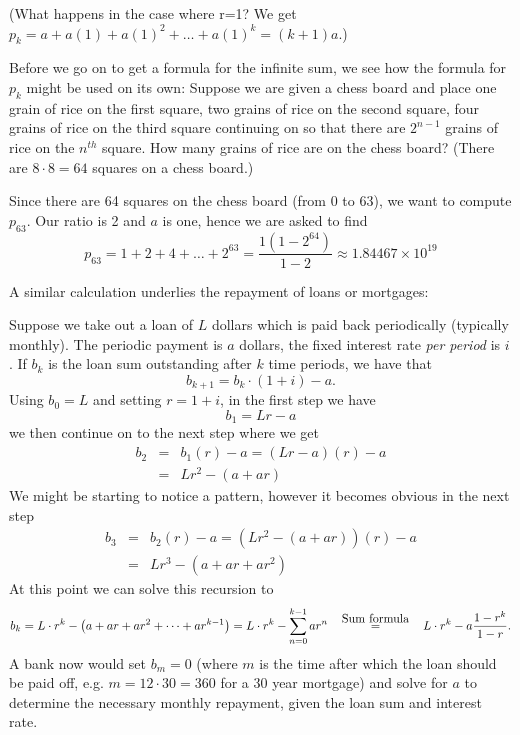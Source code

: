 (What happens in the case where r=1?
We get $p_{k}= a + a(1) + a(1)^{2} + \ldots + a(1)^{k}=(k+1)a$.)
\medskip

Before we go on to get a formula for the infinite sum, we see
how the formula for $p_{k}$ might be used on its own:
Suppose we are given a chess board and place one grain of rice on
the first square, two grains of rice on the second square, four
grains of rice on the third square continuing on so that there are
$2^{n-1}$ grains of rice on the $n^{th}$ square.  How many grains of
rice are on the chess board? (There are $8\cdot 8=64$ squares on a chess
board.)

Since there are 64 squares on the chess board (from $0$ to $63$), we want to compute
$p_{63}$.  Our ratio is 2 and $a$ is one, hence we are asked to find
\[
p_{63}=1+2+4+ \ldots +2^{63} =
\frac{1(1-2^{64})}{1-2} \approx 1.84467 \times 10^{19}
\]

A similar calculation underlies the repayment of loans or mortgages:

Suppose we take out a loan of $L$ dollars which is paid back
periodically (typically monthly). The periodic payment is $a$
dollars, the fixed interest rate \textit{per period} is $i$. If
$b_k$ is the loan sum outstanding after $k$ time periods, we have
that
\[
b_{k+1}=b_k\cdot (1+i)-a.
\]
Using $b_0=L$ and setting $r=1+i$, in the first step we have
\[b_{1}=Lr-a\] we then continue on to the next step where we
get
\begin{eqnarray*}
b_{2}&=&b_{1}(r)-a
=(Lr-a)(r)-a \\
&=&Lr^{2}-(a+ar)
\end{eqnarray*}
We might be starting to notice a pattern, however it becomes obvious
in the next step
\begin{eqnarray*}
b_{3}&=&b_{2}(r)-a
=(Lr^{2}-(a+ar))(r)-a \\
&=&Lr^{3}-(a+ar+ar^{2})
\end{eqnarray*}
At this point we can solve this recursion to
\[
b_k=L\cdot r^k-\left(a+ar+ar^2+\cdots+ar^{k-1}\right)
=L\cdot r^k-\sum_{n=0}^{k-1}ar^n
\mathop{=}\limits^{\mbox{\quad Sum formula\quad}}L\cdot r^k-a\frac{1-r^k}{1-r}.
\]
A bank now would set $b_m=0$ (where $m$ is the time after which the loan
should be paid off, e.g. $m=12\cdot 30=360$ for a 30 year mortgage)
and solve for $a$ to determine the
necessary monthly repayment, given the loan sum and interest rate.

